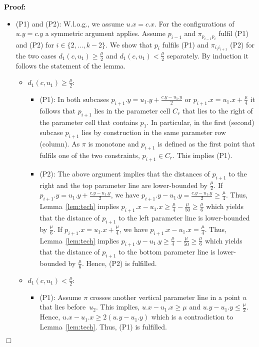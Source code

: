 \documentclass[a4paper,11pt]{article}
\newenvironment{proof}{\textbf{Proof:}}{\hspace*{0mm}\hfill\ensuremath{\Box}}
\begin{document}
\begin{proof}
\begin{itemize}
	\item (P1) and (P2): W.l.o.g., we assume $u.x = c.x$. For the configurations of $u.y = c.y$ a symmetric argument applies. Assume $p_{i-1}$ and $\pi_{p_{i-1}p_{i}}$ fulfil (P1) and (P2) for $i \in \{ 2,\dots, k-2 \}$. We show that $p_{i}$ fulfils (P1) and $\pi_{i_{i}i_{i+1}}$ (P2) for the two cases $d_1(c,u_1) \geq \frac{\mu}{2}$ and $d_1(c,u_1) < \frac{\mu}{2}$ separately. By induction it follows the statement of the lemma.
		\begin{itemize}
			\item $d_1(c,u_1) \geq \frac{\mu}{2}$: 
				\begin{itemize}
					\item (P1): In both subcases $p_{i+1}.y = u_1.y + \frac{c.y-u_1.y}{2}$ or $p_{i+1}.x = u_1.x + \frac{\mu}{4}$ it follows that $p_{i+1}$ lies in the parameter cell $C_r$ that lies to the right of the parameter cell that contains $p_1$. In particular, in the first (second) subcase $p_{i+1}$ lies by construction in the same parameter row (column). As $\pi$ is monotone and $p_{i+1}$ is defined as the first point that fulfils one of the two constraints, $p_{i+1} \in C_r$. This implies (P1).
					\item (P2): The above argument implies that the distances of $p_{i+1}$ to the right and the top parameter line are lower-bounded by $\frac{\mu}{2}$. If $p_{i+1}.y = u_1.y + \frac{c.y-u_1.y}{2}$, we have $p_{i+1}.y - u_1.y = \frac{c.y-u_1.y}{2} \geq \frac{\mu}{4}$. Thus, Lemma~\ref{lem:tech} implies $p_{i+1}.x-u_1.x \geq \frac{\mu}{4} - \frac{\mu}{50} \geq \frac{\mu}{6}$ which yields that the distance of $p_{i+1}$ to the left parameter line is lower-bounded by $\frac{\mu}{6}$. If $p_{i+1}.x = u_1.x + \frac{\mu}{4}$, we have $p_{i+1}.x - u_1.x = \frac{\mu}{4}$. Thus, Lemma~\ref{lem:tech} implies $p_{i+1}.y - u_1.y \geq \frac{\mu}{4} - \frac{\mu}{50} \geq \frac{\mu}{6}$ which yields that the distance of $p_{i+1}$ to the bottom parameter line is lower-bounded by $\frac{\mu}{6}$. Hence, (P2) is fulfilled.
				\end{itemize}
			\item $d_1(c,u_1) < \frac{\mu}{2}$: 
				\begin{itemize}
					\item (P1): Assume $\pi$ crosses another vertical parameter line in a point $u$ that lies before~$u_2$. This implies, $u.x - u_1.x \geq \mu$ and $u.y - u_1.y \leq \frac{\mu}{2}$. Hence, $u.x - u_1.x \geq 2 (u.y - u_1.y)$ which is a contradiction to Lemma~\ref{lem:tech}. Thus, (P1) is fulfilled.

\end{itemize}
\end{itemize}
\end{itemize}
\end{proof}
\end{document}
